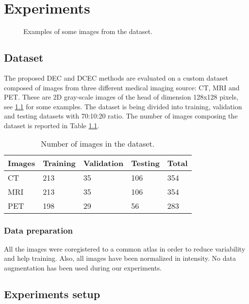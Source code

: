 \chapter{Experiments}

\begin{figure}[H]
  \centering
  
  \caption{Examples of some images from the dataset.}
  \label{dataset}
\end{figure}

\section{Dataset}

The proposed DEC and DCEC methods are evaluated on a custom dataset composed of images from three different medical imaging source: CT, MRI and PET. These are 2D gray-scale images of the head of dimension 128x128 pixels, see \ref{dataset} for some examples. The dataset is being divided into training, validation and testing datasets with 70:10:20 ratio. The number of images composing the dataset is reported in Table \ref{table:dataset}. 
\begin{table}[H]
    \centering
    \begin{tabular}{l|llll} \hline
        \textbf{Images} & \textbf{Training} & \textbf{Validation} & \textbf{Testing} & \textbf{Total} \\ \hline
        CT  & 213      & 35         & 106     & 354   \\ \hline
        MRI & 213      & 35         & 106     & 354   \\ \hline
        PET & 198      & 29         & 56      & 283  \\ \hline
    \end{tabular}
    \caption{Number of images in the dataset.}
    \label{table:dataset}
\end{table}

\subsection{Data preparation}

All the images were coregistered to a common atlas in order to reduce variability and help training. Also, all images have been normalized in intensity. No data augmentation has been used during our experiments.

\section{Experiments setup}

